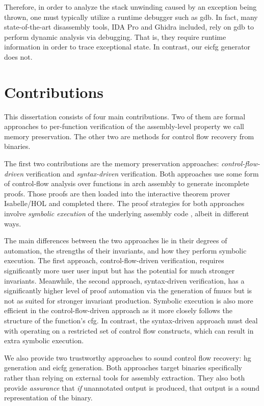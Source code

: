 Therefore, in order to analyze the stack unwinding caused by an exception being thrown, one must typically utilize a runtime debugger such as \ac{gdb}.
In fact, many state-of-the-art disassembly tools, IDA Pro and Ghidra included,
rely on \ac{gdb} to perform dynamic analysis via debugging.
That is, they require runtime information in order to trace exceptional state.
In contrast, our \ac{eicfg} generator does not.

\section{Contributions}
This dissertation consists of four main contributions.
Two of them are formal approaches to per-function verification of the assembly-level property we call memory preservation.
The other two are methods for control flow recovery from binaries.

The first two contributions are the memory preservation approaches: \emph{control-flow-driven} verification and \emph{syntax-driven} verification.
Both approaches use some form of control-flow analysis over functions in \gls{arch} assembly to generate incomplete proofs.
Those proofs are then loaded into the interactive theorem prover Isabelle/HOL%
and completed there.
The proof strategies for both approaches involve \emph{symbolic execution} of the underlying assembly code \autocite{king1976symbolic}, albeit in different ways.

The main differences between the two approaches lie in their degrees of automation, the strengths of their invariants, and how they perform symbolic execution.
The first approach, control-flow-driven verification, requires significantly more user user input but has the potential for much stronger invariants.
Meanwhile, the second approach, syntax-driven verification, has a significantly higher level of proof automation via the generation of \acp{fmuc} but is not as suited for stronger invariant production.
Symbolic execution is also more efficient in the control-flow-driven approach as it more closely follows the structure of the function's \ac{cfg}.
In contrast, the syntax-driven approach must deal with operating on a restricted set of control flow constructs, which can result in extra symbolic execution.

We also provide two trustworthy approaches to sound control flow recovery: \ac{hg} generation and \ac{eicfg} generation.
Both approaches target binaries specifically rather than relying on external tools for assembly extraction.
They also both provide \emph{assurance} that \emph{if} unannotated output is produced, that output is a sound representation of the binary.

